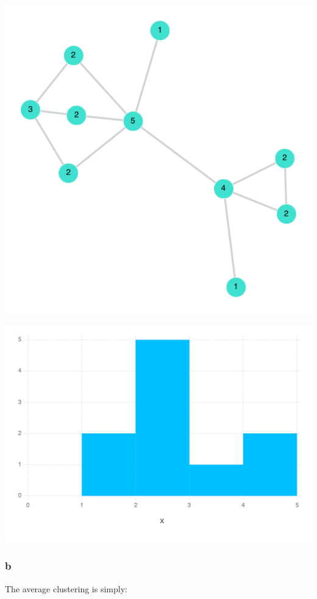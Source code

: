 \documentclass[a4paper,12pt]{article}
\begin{document}
\includegraphics[width=\linewidth]{figures/labels.png}

\includegraphics[width=\linewidth]{figures/ps1_3_1.png}



\subsubsection*{b}

The average clustering is simply:
\end{document}
